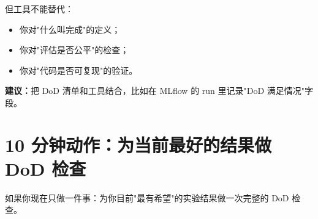 但工具不能替代：
\begin{itemize}
  \item 你对"什么叫完成"的定义；
  \item 你对"评估是否公平"的检查；
  \item 你对"代码是否可复现"的验证。
\end{itemize}

\textbf{建议：}把 DoD 清单和工具结合，比如在 MLflow 的 run 里记录"DoD 满足情况"字段。

\section{10 分钟动作：为当前最好的结果做 DoD 检查}

如果你现在只做一件事：为你目前"最有希望"的实验结果做一次完整的 DoD 检查。

